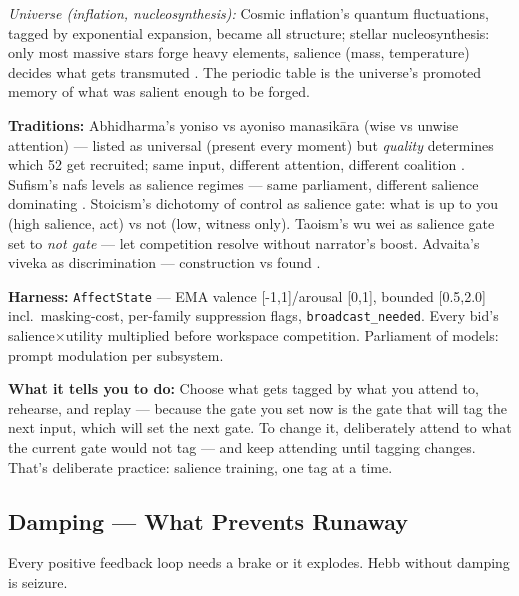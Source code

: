 \documentclass[11pt]{article}
\begin{document}
\textit{Universe (inflation, nucleosynthesis):} Cosmic inflation's quantum fluctuations, tagged by exponential expansion, became all structure; stellar nucleosynthesis: only most massive stars forge heavy elements, salience (mass, temperature) decides what gets transmuted \citep{white1986,dorkenwald2023}. The periodic table is the universe's promoted memory of what was salient enough to be forged.

\textbf{Traditions:} Abhidharma's yoniso vs ayoniso manasik\=ara (wise vs unwise attention) --- listed as universal (present every moment) but \emph{quality} determines which 52 get recruited; same input, different attention, different coalition \citep{ghazali1106ihya}. Sufism's nafs levels as salience regimes --- same parliament, different salience dominating \citep{ibnarabi1238futuhat}. Stoicism's dichotomy of control as salience gate: what is up to you (high salience, act) vs not (low, witness only). Taoism's wu wei as salience gate set to \emph{not gate} --- let competition resolve without narrator's boost. Advaita's viveka as discrimination --- construction vs found \citep{ibnarabi1229fusus}.

\textbf{Harness:} \texttt{AffectState} --- EMA valence [-1,1]/arousal [0,1], bounded [0.5,2.0] incl.\ masking-cost, per-family suppression flags, \texttt{broadcast\_needed}. Every bid's salience$\times$utility multiplied before workspace competition. Parliament of models: prompt modulation per subsystem.

\textbf{What it tells you to do:} Choose what gets tagged by what you attend to, rehearse, and replay --- because the gate you set now is the gate that will tag the next input, which will set the next gate. To change it, deliberately attend to what the current gate would not tag --- and keep attending until tagging changes. That's deliberate practice: salience training, one tag at a time.

\subsection{Damping --- What Prevents Runaway}

Every positive feedback loop needs a brake or it explodes. Hebb without damping is seizure.
\end{document}
